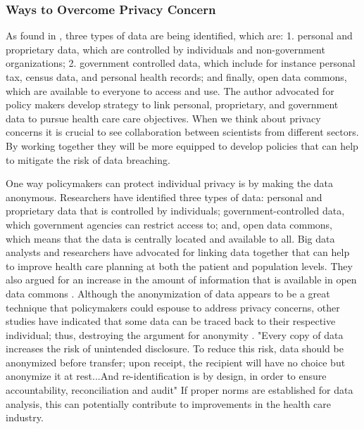 \documentclass[sigconf]{acmart}
\begin{document}
\subsubsection{Ways to Overcome Privacy Concern}


As found in \cite{van2011health}, three types of data are being identified, which are: 1. personal and proprietary data, which are controlled by individuals and non-government organizations; 2. government controlled data, which include for instance personal tax, census data, and personal health records; and finally, open data commons, which are available to everyone to access and use. The author advocated for policy makers develop strategy to link personal, proprietary, and government data to pursue health care care objectives. When we think about privacy concerns it is crucial to see collaboration between scientists from different sectors. By working together they will be more equipped to develop policies that can help to mitigate the risk of data breaching.

One way policymakers can protect individual privacy is by making the data anonymous. Researchers have identified three types of data: personal and proprietary data that is controlled by individuals; government-controlled data, which government agencies can restrict access to; and, open data commons, which means that the data is centrally located and available to all. Big data analysts and researchers have advocated for linking data together that can help to improve health care planning at both the patient and population levels. They also argued for an increase in the amount of information that is available in open data commons \cite{roski2014creating}. Although the anonymization of data appears to be a great technique that policymakers could espouse to address privacy concerns, other studies have indicated that some data can be traced back to their respective individual; thus, destroying the argument for anonymity \cite{van2011health}.  "Every copy of data increases the risk of unintended disclosure. To reduce this risk, data should be anonymized before transfer; upon receipt, the recipient will have no choice but anonymize it at rest...And re-identification is by design, in order to ensure accountability, reconciliation and audit" \cite{cavoukian2012privacy} If proper norms are established for data analysis, this can potentially contribute to improvements in the health care industry. 
\end{document}
